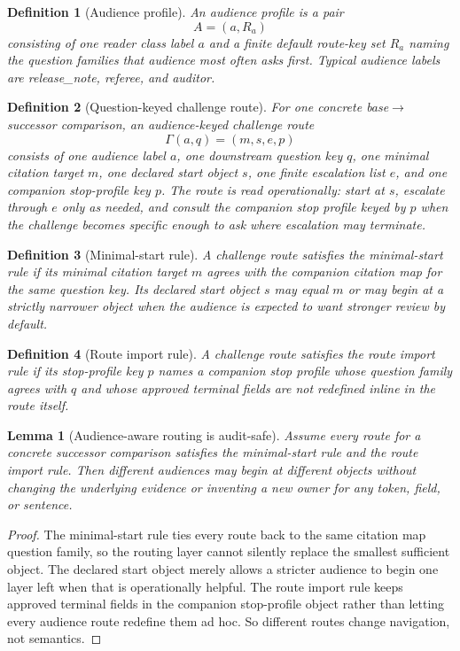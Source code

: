 \documentclass[11pt]{article}
\newtheorem{definition}{Definition}
\newtheorem{lemma}{Lemma}
\begin{document}
\begin{definition}[Audience profile]
An \emph{audience profile} is a pair
\[
A=(a,R_a)
\]
consisting of one reader class label $a$ and a finite default route-key set $R_a$ naming the question families that audience most often asks first.
Typical audience labels are \textsf{release\_note}, \textsf{referee}, and \textsf{auditor}.
\end{definition}

\begin{definition}[Question-keyed challenge route]
For one concrete base$\to$successor comparison, an \emph{audience-keyed challenge route}
\[
\Gamma(a,q)=(m,s,e,p)
\]
consists of one audience label $a$, one downstream question key $q$, one minimal citation target $m$, one declared start object $s$, one finite escalation list $e$, and one companion stop-profile key $p$.
The route is read operationally: start at $s$, escalate through $e$ only as needed, and consult the companion stop profile keyed by $p$ when the challenge becomes specific enough to ask where escalation may terminate.
\end{definition}

\begin{definition}[Minimal-start rule]
A challenge route satisfies the \emph{minimal-start rule} if its minimal citation target $m$ agrees with the companion citation map for the same question key.
Its declared start object $s$ may equal $m$ or may begin at a strictly narrower object when the audience is expected to want stronger review by default.
\end{definition}

\begin{definition}[Route import rule]
A challenge route satisfies the \emph{route import rule} if its stop-profile key $p$ names a companion stop profile whose question family agrees with $q$ and whose approved terminal fields are not redefined inline in the route itself.
\end{definition}

\begin{lemma}[Audience-aware routing is audit-safe]
Assume every route for a concrete successor comparison satisfies the minimal-start rule and the route import rule.
Then different audiences may begin at different objects without changing the underlying evidence or inventing a new owner for any token, field, or sentence.
\end{lemma}

\begin{proof}
The minimal-start rule ties every route back to the same citation map question family, so the routing layer cannot silently replace the smallest sufficient object.
The declared start object merely allows a stricter audience to begin one layer left when that is operationally helpful.
The route import rule keeps approved terminal fields in the companion stop-profile object rather than letting every audience route redefine them ad hoc.
So different routes change navigation, not semantics.
\end{proof}
\end{document}
